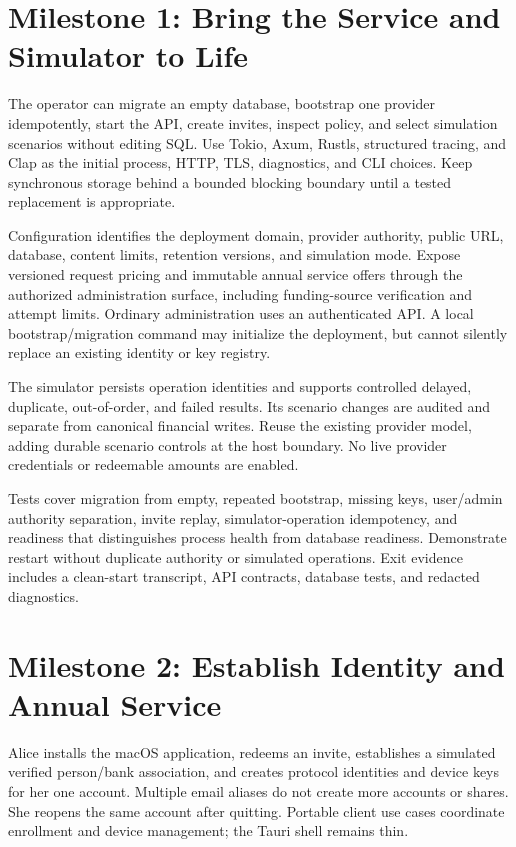 \documentclass[11pt]{article}
\begin{document}
\section{Milestone 1: Bring the Service and Simulator to Life}

The operator can migrate an empty database, bootstrap one provider idempotently,
start the API, create invites, inspect policy, and select simulation scenarios
without editing SQL. Use Tokio, Axum, Rustls, structured tracing, and Clap as the
initial process, HTTP, TLS, diagnostics, and CLI choices. Keep synchronous storage
behind a bounded blocking boundary until a tested replacement is appropriate.

Configuration identifies the deployment domain, provider authority, public URL,
database, content limits, retention versions, and simulation mode. Expose versioned
request pricing and immutable annual service offers through the authorized
administration surface, including funding-source verification and attempt limits. Ordinary
administration uses an authenticated API. A local bootstrap/migration command
may initialize the deployment, but cannot silently replace an existing identity
or key registry.

The simulator persists operation identities and supports controlled delayed,
duplicate, out-of-order, and failed results. Its scenario changes are audited
and separate from canonical financial writes. Reuse the existing provider model,
adding durable scenario controls at the host boundary. No live provider credentials or
redeemable amounts are enabled.

Tests cover migration from empty, repeated bootstrap, missing keys, user/admin
authority separation, invite replay, simulator-operation idempotency, and readiness
that distinguishes process health from database readiness. Demonstrate restart
without duplicate authority or simulated operations. Exit evidence includes a
clean-start transcript, API contracts, database tests, and redacted diagnostics.

\section{Milestone 2: Establish Identity and Annual Service}

Alice installs the macOS application, redeems an invite, establishes a simulated
verified person/bank association, and creates protocol identities and device keys
for her one account. Multiple email aliases do not create more accounts or shares.
She reopens the same account after quitting. Portable client use cases coordinate
enrollment and device management; the Tauri shell remains thin.
\end{document}
